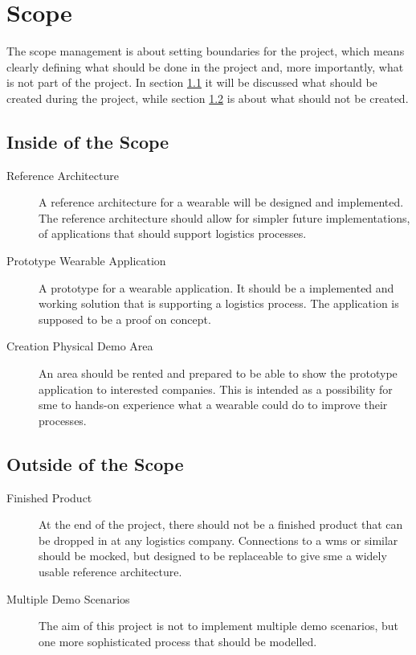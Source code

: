\chapter{Scope}\label{cha:scope}
The scope management is about setting boundaries for the project, which means clearly defining what should be done in the project and, more importantly, what is not part of the project. In section \ref{sec:insideScope} it will be discussed what should be created during the project, while section \ref{sec:outsideScope} is about what should not be created.

\section{Inside of the Scope}\label{sec:insideScope}
\begin{description}
	\item[Reference Architecture] \hfill
	
	A reference architecture for a wearable will be designed and implemented. The reference architecture should allow for simpler future implementations, of applications that should support logistics processes.
	\item[Prototype Wearable Application] \hfill
	
	A prototype for a wearable application. It should be a implemented and working solution that is supporting a logistics process. The application is supposed to be a proof on concept.
	\item[Creation Physical Demo Area] \hfill
	
	An area should be rented and prepared to be able to show the prototype application to interested companies. This is intended as a possibility for \gls{sme} to hands-on experience what a wearable could do to improve their processes.
\end{description}

\section{Outside of the Scope}\label{sec:outsideScope}
\begin{description}
	\item[Finished Product] \hfill
	
	At the end of the project, there should not be a finished product that can be dropped in at any logistics company. Connections to a \gls{wms} or similar should be mocked, but designed to be replaceable to give \gls{sme} a widely usable reference architecture.
	\item[Multiple Demo Scenarios] \hfill
	
	The aim of this project is not to implement multiple demo scenarios, but one more sophisticated process that should be modelled. 
\end{description}